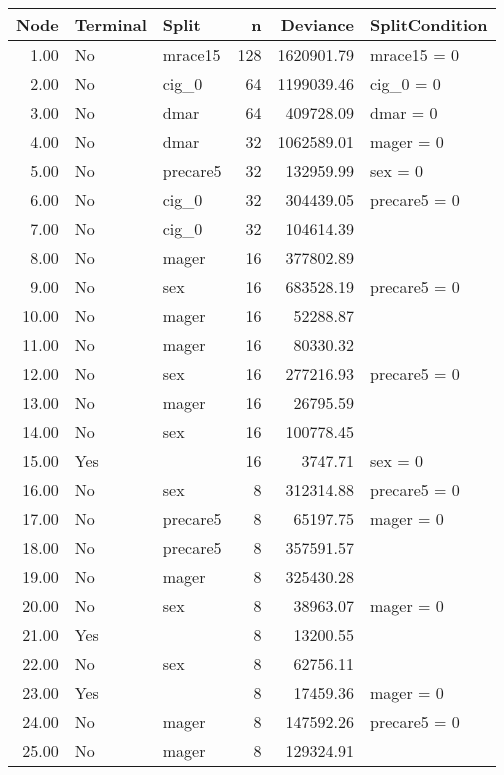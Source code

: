 \begin{table}[htbp]
\centering
\begingroup\footnotesize
\begin{tabular}{rllrrl}
  \setlength{\tabcolsep}{3pt}
 \hline
Node & Terminal & Split & n & Deviance & SplitCondition \\ 
  \hline
1.00 & No & mrace15 & 128 & 1620901.79 & mrace15 = 0 \\ 
  2.00 & No & cig_0 &  64 & 1199039.46 & cig_0 = 0 \\ 
  3.00 & No & dmar &  64 & 409728.09 & dmar = 0 \\ 
  4.00 & No & dmar &  32 & 1062589.01 & mager = 0 \\ 
  5.00 & No & precare5 &  32 & 132959.99 & sex = 0 \\ 
  6.00 & No & cig_0 &  32 & 304439.05 & precare5 = 0 \\ 
  7.00 & No & cig_0 &  32 & 104614.39 &  \\ 
  8.00 & No & mager &  16 & 377802.89 &  \\ 
  9.00 & No & sex &  16 & 683528.19 & precare5 = 0 \\ 
  10.00 & No & mager &  16 & 52288.87 &  \\ 
  11.00 & No & mager &  16 & 80330.32 &  \\ 
  12.00 & No & sex &  16 & 277216.93 & precare5 = 0 \\ 
  13.00 & No & mager &  16 & 26795.59 &  \\ 
  14.00 & No & sex &  16 & 100778.45 &  \\ 
  15.00 & Yes &  &  16 & 3747.71 & sex = 0 \\ 
  16.00 & No & sex &   8 & 312314.88 & precare5 = 0 \\ 
  17.00 & No & precare5 &   8 & 65197.75 & mager = 0 \\ 
  18.00 & No & precare5 &   8 & 357591.57 &  \\ 
  19.00 & No & mager &   8 & 325430.28 &  \\ 
  20.00 & No & sex &   8 & 38963.07 & mager = 0 \\ 
  21.00 & Yes &  &   8 & 13200.55 &  \\ 
  22.00 & No & sex &   8 & 62756.11 &  \\ 
  23.00 & Yes &  &   8 & 17459.36 & mager = 0 \\ 
  24.00 & No & mager &   8 & 147592.26 & precare5 = 0 \\ 
  25.00 & No & mager &   8 & 129324.91 &  \\ 

\end{tabular}
\end{table}
